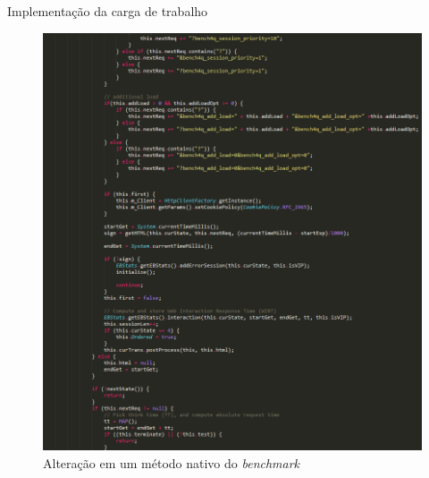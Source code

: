 \begin{frame}{Implementação da carga de trabalho}
\begin{figure}
\begin{minipage}{.45\textwidth}
			\includegraphics[scale=0.2]{images/code2-2.png}	
		\end{minipage}
		\caption{Alteração em um método nativo do \textit{benchmark}}
	\end{figure}
	
\end{frame}

